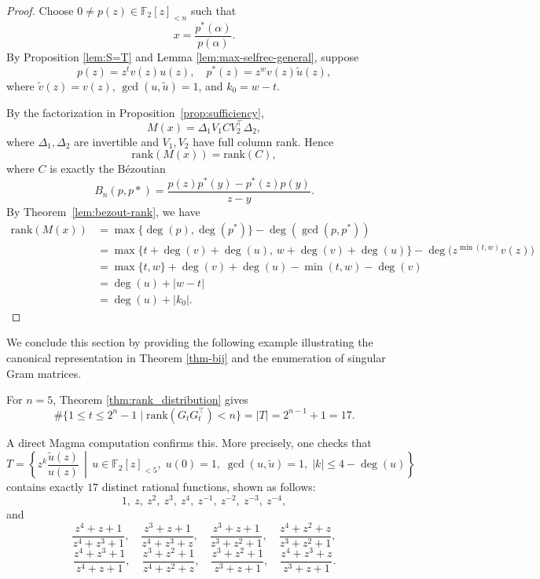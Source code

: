 \documentclass[hidelinks,onefignum,onetabnum]{siamart251216}
\theoremstyle{definition}
\theoremstyle{remark}
\providecommand{\rank}{{\mathrm{rank}}}
\begin{document}
\begin{proof}
	Choose $0\ne p(z)\in \mathbb F_2[z]_{<n}$ such that
	\[
	x=\frac{p^*(\alpha)}{p(\alpha)}.
	\]
	By Proposition \ref{lem:S=T} and Lemma \ref{lem:max-selfrec-general}, suppose
	\[
	p(z)=z^t v(z)u(z),\quad p^*(z)=z^w v(z)\widetilde{u}(z),
	\]
	where $\widetilde{v}(z)=v(z)$, $\gcd(u,\widetilde{u})=1$, and $k_0=w-t$.
	
	By the factorization in Proposition~\ref{prop:sufficiency},
	\[
	M(x)=\Delta_1V_1CV_2^\top\Delta_2,
	\]
	where $\Delta_1,\Delta_2$ are invertible and $V_1,V_2$ have full column rank. Hence
	\[
	\rank(M(x))=\rank(C),
	\]
	where $C$ is exactly the B{\'e}zoutian
	\[
	B_{n}(p,p*)=\frac{p(z)p^*(y)-p^*(z)p(y)}{z-y}.
	\]
	By Theorem~\ref{lem:bezout-rank}, we have
	\begin{align*}
		\rank(M(x))
		&=\max\{\deg(p),\deg(p^*)\}-\deg(\gcd(p,p^*))\\
		&=\max\{t+\deg(v)+\deg(u),\, w+\deg(v)+\deg(u)\}
		-\deg\bigl(z^{\min(t,w)}v(z)\bigr)\\
		&=\max\{t,w\}+\deg(v)+\deg(u)-\min(t,w)-\deg(v)\\
		&=\deg(u)+|w-t|\\
		&=\deg(u)+|k_0|.
	\end{align*}
\end{proof}






We conclude this section by providing the following example illustrating the canonical representation in Theorem \ref{thm-bij} and the enumeration of singular Gram matrices.

\begin{example}
	For $n=5$, Theorem \ref{thm:rank_distribution} gives
	\[
	\#\{1\le t\le 2^{n}-1\mid\rank(G_tG_t^\top)<n\}=	|T|=2^{n-1}+1=17.
	\]
	
	A direct Magma computation confirms this. More precisely, one checks that
	\[
	T=
	\left\{
	z^k\frac{\widetilde{u}(z)}{u(z)}
	\,\middle|\,
	u\in \mathbb F_2[z]_{<5},\;
	u(0)=1,\;
	\gcd(u,\widetilde{u})=1,\;
	|k|\le 4-\deg(u)
	\right\}
	\]
	contains exactly $17$ distinct rational functions, shown as follows:
	\[
	1,\ z,\ z^2,\ z^3,\ z^4,\ z^{-1},\ z^{-2},\ z^{-3},\ z^{-4},
	\]
	and
	\[
	\frac{z^4+z+1}{z^4+z^3+1},\quad
	\frac{z^3+z+1}{z^4+z^3+z},\quad
	\frac{z^3+z+1}{z^3+z^2+1},\quad
	\frac{z^4+z^2+z}{z^3+z^2+1},
	\]
	\[
	\frac{z^4+z^3+1}{z^4+z+1},\quad
	\frac{z^3+z^2+1}{z^4+z^2+z},\quad
	\frac{z^3+z^2+1}{z^3+z+1},\quad
	\frac{z^4+z^3+z}{z^3+z+1}.
	\]
	
\end{example}
\end{document}
